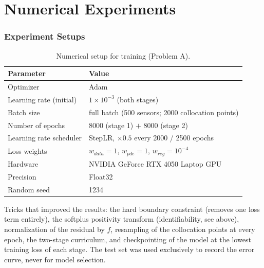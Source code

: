 \section{Numerical Experiments}
%
\subsubsection{Experiment Setups}
%
\begin{table}[htbp]
\centering
\caption{Numerical setup for training (Problem A).}
\label{tab:problem_A_setup}
\begin{tabular}{ll}
\hline
\textbf{Parameter} & \textbf{Value} \\
\hline
Optimizer                  & Adam \\
Learning rate (initial)    & $1\times10^{-3}$ (both stages) \\
Batch size                 & full batch (500 sensors; 2000 collocation points) \\
Number of epochs           & 8000 (stage 1) $+$ 8000 (stage 2) \\
Learning rate scheduler    & StepLR, $\times 0.5$ every 2000 / 2500 epochs \\
Loss weights               & $w_{data}=1$, $w_{pde}=1$, $w_{reg}=10^{-4}$ \\
Hardware                   & NVIDIA GeForce RTX 4050 Laptop GPU \\
Precision                  & Float32 \\
Random seed                & 1234 \\
\hline
\end{tabular}
\end{table}
%
Tricks that improved the results: the hard boundary constraint (removes one
loss term entirely), the softplus positivity transform (identifiability,
see above), normalization of the residual by $f$, resampling of the
collocation points at every epoch, the two-stage curriculum, and
checkpointing of the model at the lowest training loss of each stage. The
test set was used exclusively to record the error curve, never for model
selection.
%
